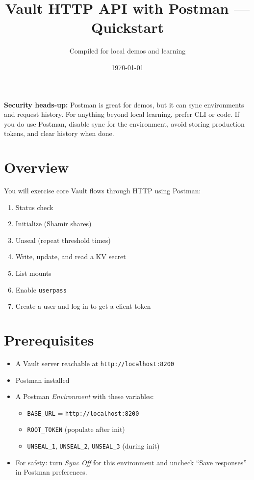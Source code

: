 \documentclass[11pt]{article}
\title{\textbf{Vault HTTP API with Postman --- Quickstart}}
\author{Compiled for local demos and learning}
\date{\today}
\begin{document}
\maketitle
\tableofcontents
\clearpage

\vspace{0.5em}
\begin{tcolorbox}[colframe=warn]
\textbf{Security heads-up:} Postman is great for demos, but it can sync environments and request history. For anything beyond local learning, prefer CLI or code. If you do use Postman, disable sync for the environment, avoid storing production tokens, and clear history when done.
\end{tcolorbox}

\section{Overview}
You will exercise core Vault flows through HTTP using Postman:
\begin{enumerate}
  \item Status check
  \item Initialize (Shamir shares)
  \item Unseal (repeat threshold times)
  \item Write, update, and read a KV secret
  \item List mounts
  \item Enable \texttt{userpass}
  \item Create a user and log in to get a client token
\end{enumerate}

\section{Prerequisites}
\begin{itemize}
  \item A Vault server reachable at \texttt{http://localhost:8200}
  \item Postman installed
  \item A Postman \emph{Environment} with these variables:
        \begin{itemize}
          \item \texttt{BASE\_URL} = \texttt{http://localhost:8200}
          \item \texttt{ROOT\_TOKEN} (populate after init)
          \item \texttt{UNSEAL\_1}, \texttt{UNSEAL\_2}, \texttt{UNSEAL\_3} (during init)
        \end{itemize}
  \item For safety: turn \emph{Sync Off} for this environment and uncheck ``Save responses'' in Postman preferences.
\end{itemize}
\end{document}
